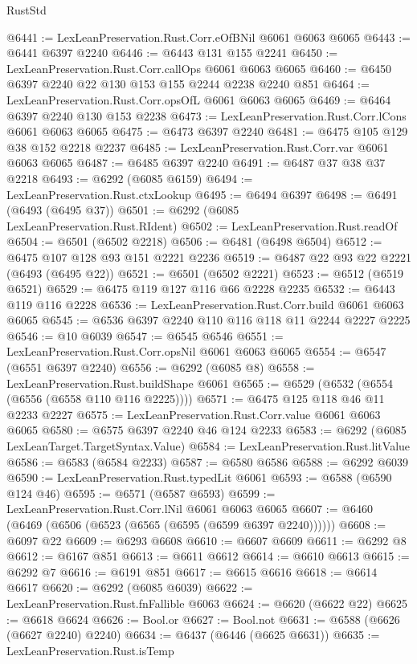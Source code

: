 \begin{lexlean}{RustStd}
\begin{coremodule}
@6441 := LexLeanPreservation.Rust.Corr.eOfBNil @6061 @6063 @6065
@6443 := @6441 @6397 @2240
@6446 := @6443 @131 @155 @2241
@6450 := LexLeanPreservation.Rust.Corr.callOps @6061 @6063 @6065
@6460 := @6450 @6397 @2240 @22 @130 @153 @155 @2244 @2238 @2240 @851
@6464 := LexLeanPreservation.Rust.Corr.opsOfL @6061 @6063 @6065
@6469 := @6464 @6397 @2240 @130 @153 @2238
@6473 := LexLeanPreservation.Rust.Corr.lCons @6061 @6063 @6065
@6475 := @6473 @6397 @2240
@6481 := @6475 @105 @129 @38 @152 @2218 @2237
@6485 := LexLeanPreservation.Rust.Corr.var @6061 @6063 @6065
@6487 := @6485 @6397 @2240
@6491 := @6487 @37 @38 @37 @2218
@6493 := @6292 (@6085 @6159)
@6494 := LexLeanPreservation.Rust.ctxLookup
@6495 := @6494 @6397
@6498 := @6491 (@6493 (@6495 @37))
@6501 := @6292 (@6085 LexLeanPreservation.Rust.RIdent)
@6502 := LexLeanPreservation.Rust.readOf
@6504 := @6501 (@6502 @2218)
@6506 := @6481 (@6498 @6504)
@6512 := @6475 @107 @128 @93 @151 @2221 @2236
@6519 := @6487 @22 @93 @22 @2221 (@6493 (@6495 @22))
@6521 := @6501 (@6502 @2221)
@6523 := @6512 (@6519 @6521)
@6529 := @6475 @119 @127 @116 @66 @2228 @2235
@6532 := @6443 @119 @116 @2228
@6536 := LexLeanPreservation.Rust.Corr.build @6061 @6063 @6065
@6545 := @6536 @6397 @2240 @110 @116 @118 @11 @2244 @2227 @2225
@6546 := @10 @6039
@6547 := @6545 @6546
@6551 := LexLeanPreservation.Rust.Corr.opsNil @6061 @6063 @6065
@6554 := @6547 (@6551 @6397 @2240)
@6556 := @6292 (@6085 @8)
@6558 := LexLeanPreservation.Rust.buildShape @6061
@6565 := @6529 (@6532 (@6554 (@6556 (@6558 @110 @116 @2225))))
@6571 := @6475 @125 @118 @46 @11 @2233 @2227
@6575 := LexLeanPreservation.Rust.Corr.value @6061 @6063 @6065
@6580 := @6575 @6397 @2240 @46 @124 @2233
@6583 := @6292 (@6085 LexLeanTarget.TargetSyntax.Value)
@6584 := LexLeanPreservation.Rust.litValue
@6586 := @6583 (@6584 @2233)
@6587 := @6580 @6586
@6588 := @6292 @6039
@6590 := LexLeanPreservation.Rust.typedLit @6061
@6593 := @6588 (@6590 @124 @46)
@6595 := @6571 (@6587 @6593)
@6599 := LexLeanPreservation.Rust.Corr.lNil @6061 @6063 @6065
@6607 := @6460 (@6469 (@6506 (@6523 (@6565 (@6595 (@6599 @6397 @2240))))))
@6608 := @6097 @22
@6609 := @6293 @6608
@6610 := @6607 @6609
@6611 := @6292 @8
@6612 := @6167 @851
@6613 := @6611 @6612
@6614 := @6610 @6613
@6615 := @6292 @7
@6616 := @6191 @851
@6617 := @6615 @6616
@6618 := @6614 @6617
@6620 := @6292 (@6085 @6039)
@6622 := LexLeanPreservation.Rust.fnFallible @6063
@6624 := @6620 (@6622 @22)
@6625 := @6618 @6624
@6626 := Bool.or
@6627 := Bool.not
@6631 := @6588 (@6626 (@6627 @2240) @2240)
@6634 := @6437 (@6446 (@6625 @6631))
@6635 := LexLeanPreservation.Rust.isTemp

\end{coremodule}
\end{lexlean}
